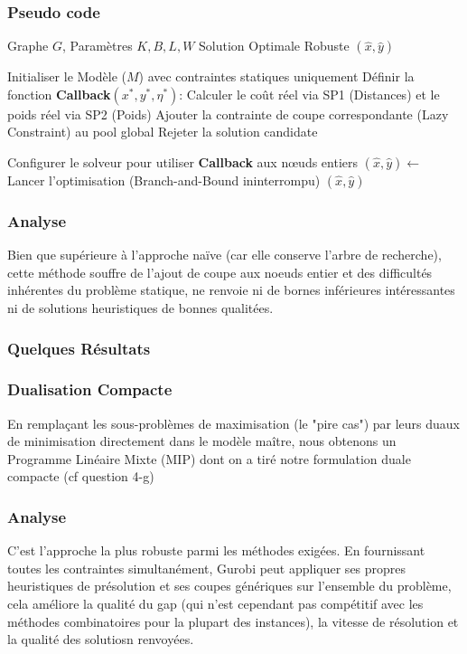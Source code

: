 \documentclass{article}
\begin{document}
\subsubsection*{Pseudo code}
\begin{algorithm}[H]
\caption{Branch-and-Cut (LazyCallback)}
\begin{algorithmic}[1]
\REQUIRE Graphe $G$, Paramètres $K, B, L, W$
\ENSURE Solution Optimale Robuste $(\hat{x}, \hat{y})$

\STATE Initialiser le Modèle ($M$) avec contraintes statiques uniquement
\STATE Définir la fonction \textbf{Callback}$(x^*, y^*, \eta^*)$:
    \STATE \quad Calculer le coût réel via SP1 (Distances) et le poids réel via SP2 (Poids)
        \STATE \quad Ajouter la contrainte de coupe correspondante (Lazy Constraint) au pool global
        \STATE \quad Rejeter la solution candidate
    \ENDIF

\STATE Configurer le solveur pour utiliser \textbf{Callback} aux nœuds entiers
\STATE $(\hat{x}, \hat{y}) \leftarrow$ Lancer l'optimisation (Branch-and-Bound ininterrompu)
\RETURN $(\hat{x}, \hat{y})$
\end{algorithmic}
\end{algorithm}

\subsubsection*{Analyse}
Bien que supérieure à l'approche naïve (car elle conserve l'arbre de recherche), cette méthode souffre de l'ajout de coupe aux noeuds entier et des difficultés inhérentes du problème statique, ne renvoie ni de bornes inférieures intéressantes ni de solutions heuristiques de bonnes qualitées. 
\subsubsection*{Quelques Résultats}


\subsubsection{Dualisation Compacte}
En remplaçant les sous-problèmes de maximisation (le "pire cas") par leurs duaux de minimisation directement dans le modèle maître, nous obtenons un Programme Linéaire Mixte (MIP) dont on a tiré notre formulation duale compacte (cf question 4-g)

\subsubsection*{Analyse}
C'est l'approche la plus robuste parmi les méthodes exigées. En fournissant toutes les contraintes simultanément, Gurobi peut appliquer ses propres heuristiques de présolution et ses coupes génériques sur l'ensemble du problème, cela améliore la qualité du gap (qui n'est cependant pas compétitif avec les méthodes combinatoires pour la plupart des instances), la vitesse de résolution et la qualité des solutiosn renvoyées.
\end{document}
